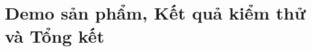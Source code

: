 \documentclass[a4paper]{article}
\theoremstyle{definition}
\begin{document}
\part{Demo sản phẩm, Kết quả kiểm thử và Tổng kết}

\newpage

\newpage


\newpage

\end{document}

